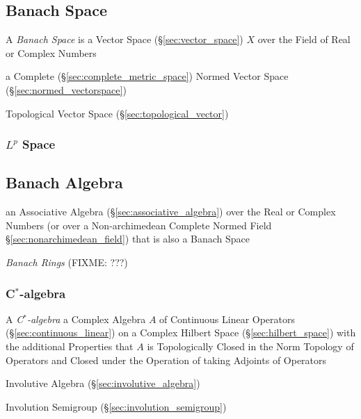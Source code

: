 \subsection{Banach Space}\label{sec:banach_space}

A \emph{Banach Space} is a Vector Space (\S\ref{sec:vector_space}) $X$ over the
Field of Real or Complex Numbers

a Complete (\S\ref{sec:complete_metric_space}) Normed Vector Space
(\S\ref{sec:normed_vectorspace})

Topological Vector Space (\S\ref{sec:topological_vector})



\subsubsection{$L^p$ Space}\label{sec:lp_space}



\subsection{Banach Algebra}\label{sec:banach_algebra}

an Associative Algebra (\S\ref{sec:associative_algebra}) over the Real or
Complex Numbers (or over a Non-archimedean Complete Normed Field
\S\ref{sec:nonarchimedean_field}) that is also a Banach Space

\emph{Banach Rings} (FIXME: ???)



\subsubsection{C$^*$-algebra}\label{sec:cstar_algebra}

A \emph{C$^*$-algebra} a Complex Algebra $A$ of Continuous Linear
Operators (\S\ref{sec:continuous_linear}) on a Complex Hilbert Space
(\S\ref{sec:hilbert_space}) with the additional Properties that $A$ is
Topologically Closed in the Norm Topology of Operators and Closed
under the Operation of taking Adjoints of Operators

Involutive Algebra (\S\ref{sec:involutive_algebra})

Involution Semigroup (\S\ref{sec:involution_semigroup})

